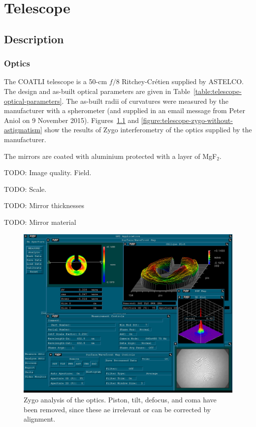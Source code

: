 
\chapter{Telescope}
\label{chapter:telescope}

\section{Description}


\subsection{Optics}

The COATLI telescope is a 50-cm $f/8$ Ritchey-Crétien supplied by ASTELCO. The design and as-built optical parameters are given in Table~\ref{table:telescope-optical-parameters}. The as-built radii of curvatures were measured by the manufacturer with a spherometer (and supplied in an email message from Peter Aniol on 9 November 2015). Figures~\ref{figure:telescope-zygo-with-astigmatism} and \ref{figure:telescope-zygo-without-astigmatism} show the results of Zygo interferometry of the optics supplied by the manufacturer. 

The mirrors are coated with aluminium protected with a layer of MgF$_2$.

TODO: Image quality. Field.

TODO: Scale.

TODO: Mirror thicknesses

TODO: Mirror material

\begin{figure}
\begin{center}
\includegraphics[width=1.0\linewidth]{figures/telescope-zygo-with-astigmatism.jpg}
\end{center}
\caption{Zygo analysis of the optics. Piston, tilt, defocus, and coma have been removed, since these ae irrelevant or can be corrected by alignment.}
\label{figure:telescope-zygo-with-astigmatism}
\end{figure}

